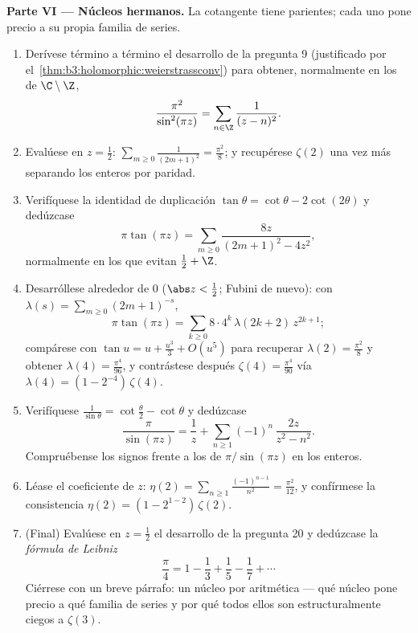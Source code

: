 \begin{problem}
\medskip
\noindent\textbf{Parte VI --- Núcleos hermanos.} La cotangente tiene
parientes; cada uno pone precio a su propia familia de series.
\begin{enumerate}[resume]
  \item Derívese término a término el desarrollo de la pregunta 9
  (justificado por el~\cref{thm:b3:holomorphic:weierstrassconv}) para
  obtener, normalmente en los
   de $\C\setminus\Z$,
        \[
        \frac{\pi^2}{\sin^2(\pi z)} =
        \sum_{n\in\Z}\frac1{(z - n)^2} .
        \]
  \item Evalúese en $z = \frac12$:
        $\sum_{m\geq0}\frac1{(2m+1)^2} = \frac{\pi^2}8$;
        y recupérese $\zeta(2)$ una vez más separando los enteros por
        paridad. \item Verifíquese la identidad de duplicación
        $\tan\theta =
        \cot\theta - 2\cot(2\theta)$ y dedúzcase
        \[
        \pi\tan(\pi z) =
        \sum_{m\geq0}\frac{8z}{(2m+1)^2 - 4z^2} ,
        \]
        normalmente en los 
        que evitan $\frac12 + \Z$. \item Desarróllese alrededor de $0$
        ($\abs z < \frac12$; Fubini de nuevo): con $\lambda(s) =
        \sum_{m\geq0}(2m+1)^{-s}$,
        \[
        \pi\tan(\pi z) =
        \sum_{k\geq0}8\cdot4^k\,\lambda(2k+2)\,z^{2k+1} ;
        \]
        compárese con $\tan u = u + \frac{u^3}3 + O(u^5)$ para recuperar
        $\lambda(2) = \frac{\pi^2}8$ y obtener
        $\lambda(4) = \frac{\pi^4}{96}$, y contrástese después
        $\zeta(4) = \frac{\pi^4}{90}$ vía $\lambda(4) = (1 -
        2^{-4})\,\zeta(4)$. \item Verifíquese
        $\frac1{\sin\theta} = \cot\frac\theta2 -
        \cot\theta$ y dedúzcase
        \[
        \frac{\pi}{\sin(\pi z)} = \frac1z +
        \sum_{n\geq1}(-1)^n\,\frac{2z}{z^2 - n^2} .
        \]
        Compruébense los signos frente a los
         de
        $\pi/\sin(\pi z)$ en los enteros. \item Léase el coeficiente de
        $z$: $\eta(2) =
        \sum_{n\geq1}\frac{(-1)^{n-1}}{n^2} =
        \frac{\pi^2}{12}$, y confírmese la consistencia
        $\eta(2) = (1 - 2^{1-2})\,\zeta(2)$.
  \item (Final) Evalúese en $z =
        \frac12$ el desarrollo de la pregunta 20 y dedúzcase la
  \emph{fórmula de Leibniz}
        \[
        \frac\pi4 = 1 - \frac13 + \frac15 - \frac17 +
        \cdots
        \]
        Ciérrese con un breve párrafo: un núcleo por aritmética --- qué
        núcleo pone precio a qué familia de series y por qué todos ellos
        son estructuralmente ciegos a $\zeta(3)$.


\end{enumerate}
\end{problem}
